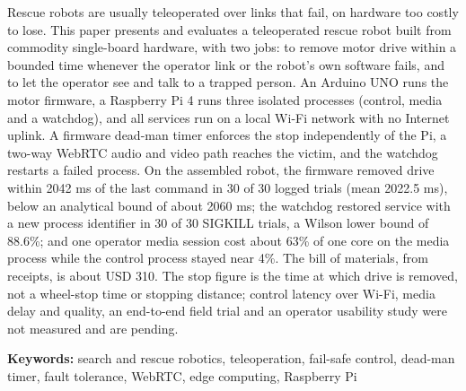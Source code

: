 \documentclass[12pt,a4paper]{report}
\makeatletter
\renewcommand{\tableofcontents}{%
    \clearpage
    \thispagestyle{plain}
    \vspace{1cm}
    \@starttoc{toc}
    \clearpage
}
\makeatother
\begin{document}
Rescue robots are usually teleoperated over links that fail, on hardware too costly to lose. This paper presents and evaluates a teleoperated rescue robot built from commodity single-board hardware, with two jobs: to remove motor drive within a bounded time whenever the operator link or the robot's own software fails, and to let the operator see and talk to a trapped person. An Arduino UNO runs the motor firmware, a Raspberry Pi 4 runs three isolated processes (control, media and a watchdog), and all services run on a local Wi-Fi network with no Internet uplink. A firmware dead-man timer enforces the stop independently of the Pi, a two-way WebRTC audio and video path reaches the victim, and the watchdog restarts a failed process. On the assembled robot, the firmware removed drive within 2042 ms of the last command in 30 of 30 logged trials (mean 2022.5 ms), below an analytical bound of about 2060 ms; the watchdog restored service with a new process identifier in 30 of 30 SIGKILL trials, a Wilson lower bound of 88.6\%; and one operator media session cost about 63\% of one core on the media process while the control process stayed near 4\%. The bill of materials, from receipts, is about USD 310. The stop figure is the time at which drive is removed, not a wheel-stop time or stopping distance; control latency over Wi-Fi, media delay and quality, an end-to-end field trial and an operator usability study were not measured and are pending.

\vspace{0.5cm}
\noindent\textbf{Keywords:} search and rescue robotics, teleoperation, fail-safe control, dead-man timer, fault tolerance, WebRTC, edge computing, Raspberry Pi
\clearpage

\tableofcontents
\clearpage

\renewcommand{\listtablename}{LIST OF TABLES}
\renewcommand{\cftlottitlefont}{\hfill\Huge\bfseries}
\renewcommand{\cftafterlottitle}{\hfill}

\renewcommand{\listfigurename}{LIST OF FIGURES}
\renewcommand{\cftloftitlefont}{\hfill\Huge\bfseries}
\renewcommand{\cftafterloftitle}{\hfill}

\listoftables
\clearpage

\listoffigures
\clearpage


\end{document}
